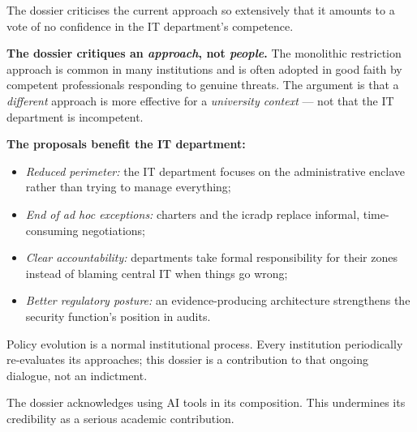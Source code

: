 \bigskip

\begin{clarificationbox}
The dossier criticises the current approach so extensively that it amounts to a vote of no confidence in the IT department's competence.
\end{clarificationbox}

\begin{answerbox}[Answer to Q10.2]
\textbf{The dossier critiques an \emph{approach}, not \emph{people}.} The monolithic restriction approach is common in many institutions and is often adopted in good faith by competent professionals responding to genuine threats. The argument is that a \emph{different} approach is more effective for a \emph{university context} --- not that the IT department is incompetent.

\medskip\noindent\textbf{The proposals benefit the IT department:}
\begin{itemize}[nosep]
    \item \emph{Reduced perimeter:} the IT department focuses on the administrative enclave rather than trying to manage everything;
    \item \emph{End of ad hoc exceptions:} charters and the \gls{icradp} replace informal, time-consuming negotiations;
    \item \emph{Clear accountability:} departments take formal responsibility for their zones instead of blaming central IT when things go wrong;
    \item \emph{Better regulatory posture:} an evidence-producing architecture strengthens the security function's position in audits.
\end{itemize}

\noindent Policy evolution is a normal institutional process. Every institution periodically re-evaluates its approaches; this dossier is a contribution to that ongoing dialogue, not an indictment.
\end{answerbox}

\bigskip

\begin{clarificationbox}
The dossier acknowledges using AI tools in its composition. This undermines its credibility as a serious academic contribution.
\end{clarificationbox}

